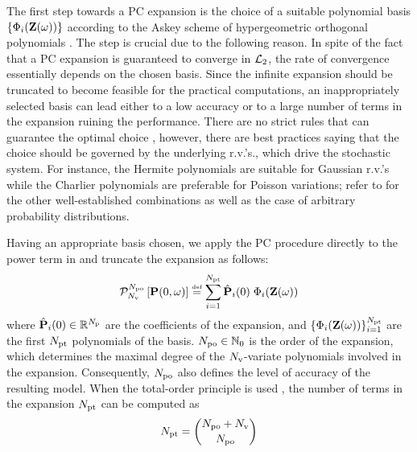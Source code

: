 The first step towards a PC expansion is the choice of a suitable polynomial basis $\{ \Phi_i(\mathbf{Z}(\omega)) \}$ according to the Askey scheme of hypergeometric orthogonal polynomials \cite{xiu2002}. The step is crucial due to the following reason. In spite of the fact that a PC expansion is guaranteed to converge in $\mathcal{L}_{2}$, the rate of convergence essentially depends on the chosen basis. Since the infinite expansion should be truncated to become feasible for the practical computations, an inappropriately selected basis can lead either to a low accuracy or to a large number of terms in the expansion ruining the performance. There are no strict rules that can guarantee the optimal choice \cite{knio2006, maitre2010}, however, there are best practices saying that the choice should be governed by the underlying r.v.'s., which drive the stochastic system. For instance, the Hermite polynomials are suitable for Gaussian r.v.'s while the Charlier polynomials are preferable for Poisson variations; refer to \cite{xiu2002} for the other well-established combinations as well as the case of arbitrary probability distributions.

Having an appropriate basis chosen, we apply the PC procedure directly to the power term in  and truncate the expansion as follows:
\begin{equation} \elabel{pc-expansion}
  \oPC{\vars}{\pcorder}{\vP(0, \o)} \eqdef \sum_{i = 1}^{\pcterms} \pcc{\vP}_i(0) \; \pcb_i(\vZ(\o))
\end{equation}
where $\hat{\mathbf{P}}_i(0) \in \mathbb{R}^{N_\text{p}}$ are the coefficients of the expansion, and $\{ \Phi_i(\mathbf{Z}(\omega)) \}_{i = 1}^{{N_\text{pt}}}$ are the first ${N_\text{pt}}$ polynomials of the basis. ${N_\text{po}} \in \mathbb{N}_{0}$ is the order of the expansion, which determines the maximal degree of the ${N_\text{v}}$-variate polynomials involved in the expansion. Consequently, ${N_\text{po}}$ also defines the level of accuracy of the resulting model. When the total-order principle is used \cite{eldred2009}, the number of terms in the expansion ${N_\text{pt}}$ can be computed as
\begin{equation} \elabel{pc-terms}
  \pcterms = {\pcorder + \vars \choose \pcorder}
\end{equation}

